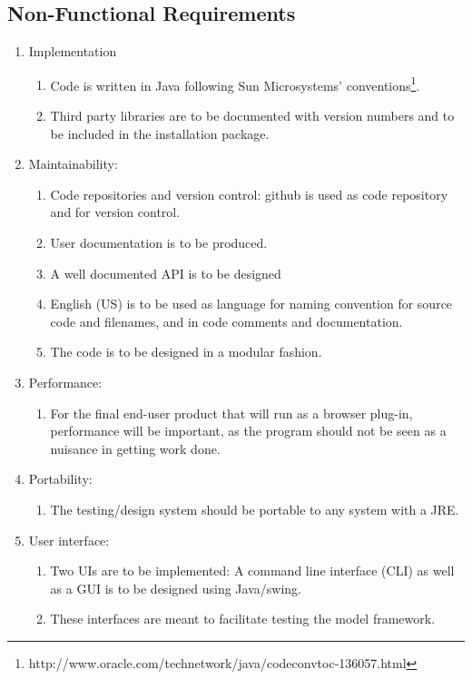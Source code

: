 \subsection{Non-Functional Requirements}
\begin{enumerate}
\item Implementation
  \begin{enumerate}
  \item Code is written in Java following Sun Microsystems' conventions\footnote{http://www.oracle.com/technetwork/java/codeconvtoc-136057.html}.
  \item Third party libraries are to be documented with version numbers and to be included in the installation package.
\end{enumerate}

\item Maintainability:
  \begin{enumerate}
  \item Code repositories and version control: github is used as code repository and for version control.
  \item User documentation is to be produced.
  \item A well documented API is to be designed	
  \item English (US) is to be used as language for naming convention for source code and filenames, and in code comments and documentation.
  \item The code is to be designed in a modular fashion.
  \end{enumerate}

\item Performance: 
  \begin{enumerate}
  \item For the final end-user product that will run as a browser plug-in, performance will be important, as the program should not be seen as a nuisance in getting work done.
  \end{enumerate}

\item Portability: 
  \begin{enumerate}
  \item The testing/design system should be portable to any system with a JRE.
  \end{enumerate}

\item User interface:
  \begin{enumerate}
  \item Two UIs are to be implemented: A command line interface (CLI) as well as a GUI is to be designed using Java/swing.
  \item These interfaces are meant to facilitate testing the model framework.
  \end{enumerate}
\end{enumerate}
